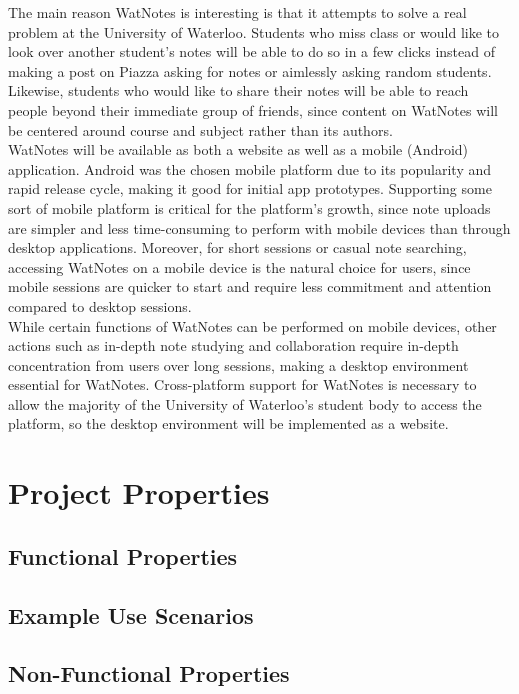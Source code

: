 \documentclass[12pt]{article}
\begin{document}
  The main reason WatNotes is interesting is that it attempts to solve a real problem at the University of Waterloo. Students who miss class or would like to look over another student's notes will be able to do so in a few clicks instead of making a post on Piazza asking for notes or aimlessly asking random students. Likewise, students who would like to share their notes will be able to reach people beyond their immediate group of friends, since content on WatNotes will be centered around course and subject rather than its authors. \\

WatNotes will be available as both a website as well as a mobile (Android) application. Android was the chosen mobile platform due to its popularity and rapid release cycle, making it good for initial app prototypes. Supporting some sort of mobile platform is critical for the platform's growth, since note uploads are simpler and less time-consuming to perform with mobile devices than through desktop applications. Moreover, for short sessions or casual note searching, accessing WatNotes on a mobile device is the natural choice for users, since mobile sessions are quicker to start and require less commitment and attention compared to desktop sessions. \\

While certain functions of WatNotes can be performed on mobile devices, other actions such as in-depth note studying and collaboration require in-depth concentration from users over long sessions, making a desktop environment essential for WatNotes. Cross-platform support for WatNotes is necessary to allow the majority of the University of Waterloo's student body to access the platform, so the desktop environment will be implemented as a website. \\
\newpage

\section{Project Properties}
\subsection{Functional Properties}
\subsection{Example Use Scenarios}
\subsection{Non-Functional Properties}
\end{document}
